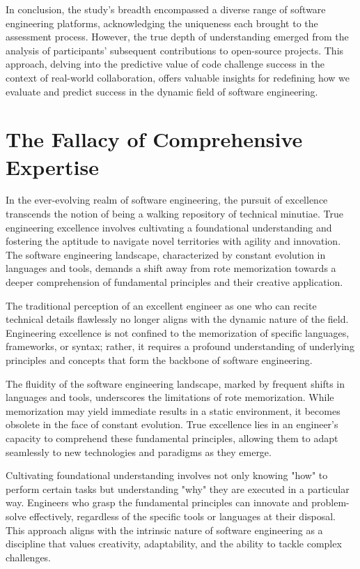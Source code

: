 \documentclass[
    a4paper, %
    10pt, %
    unnumberedsections, %
    twoside, %
]{LTJournalArticle}
\begin{document}
In conclusion, the study's breadth encompassed a diverse range of software engineering platforms, acknowledging the uniqueness each brought to the assessment process. However, the true depth of understanding emerged from the analysis of participants' subsequent contributions to open-source projects. This approach, delving into the predictive value of code challenge success in the context of real-world collaboration, offers valuable insights for redefining how we evaluate and predict success in the dynamic field of software engineering.


\section{The Fallacy of Comprehensive Expertise}

In the ever-evolving realm of software engineering, the pursuit of excellence transcends the notion of being a walking repository of technical minutiae. True engineering excellence involves cultivating a foundational understanding and fostering the aptitude to navigate novel territories with agility and innovation. The software engineering landscape, characterized by constant evolution in languages and tools, demands a shift away from rote memorization towards a deeper comprehension of fundamental principles and their creative application.

The traditional perception of an excellent engineer as one who can recite technical details flawlessly no longer aligns with the dynamic nature of the field. Engineering excellence is not confined to the memorization of specific languages, frameworks, or syntax; rather, it requires a profound understanding of underlying principles and concepts that form the backbone of software engineering.

The fluidity of the software engineering landscape, marked by frequent shifts in languages and tools, underscores the limitations of rote memorization. While memorization may yield immediate results in a static environment, it becomes obsolete in the face of constant evolution. True excellence lies in an engineer's capacity to comprehend these fundamental principles, allowing them to adapt seamlessly to new technologies and paradigms as they emerge.

Cultivating foundational understanding involves not only knowing "how" to perform certain tasks but understanding "why" they are executed in a particular way. Engineers who grasp the fundamental principles can innovate and problem-solve effectively, regardless of the specific tools or languages at their disposal. This approach aligns with the intrinsic nature of software engineering as a discipline that values creativity, adaptability, and the ability to tackle complex challenges.
\end{document}
